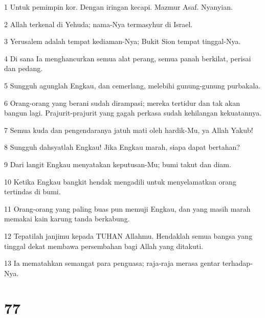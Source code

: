 \par 1 Untuk pemimpin kor. Dengan iringan kecapi. Mazmur Asaf. Nyanyian.
\par 2 Allah terkenal di Yehuda; nama-Nya termasyhur di Israel.
\par 3 Yerusalem adalah tempat kediaman-Nya; Bukit Sion tempat tinggal-Nya.
\par 4 Di sana Ia menghancurkan semua alat perang, semua panah berkilat, perisai dan pedang.
\par 5 Sungguh agunglah Engkau, dan cemerlang, melebihi gunung-gunung purbakala.
\par 6 Orang-orang yang berani sudah dirampasi; mereka tertidur dan tak akan bangun lagi. Prajurit-prajurit yang gagah perkasa sudah kehilangan kekuatannya.
\par 7 Semua kuda dan pengendaranya jatuh mati oleh hardik-Mu, ya Allah Yakub!
\par 8 Sungguh dahsyatlah Engkau! Jika Engkau marah, siapa dapat bertahan?
\par 9 Dari langit Engkau menyatakan keputusan-Mu; bumi takut dan diam.
\par 10 Ketika Engkau bangkit hendak mengadili untuk menyelamatkan orang tertindas di bumi.
\par 11 Orang-orang yang paling buas pun memuji Engkau, dan yang masih marah memakai kain karung tanda berkabung.
\par 12 Tepatilah janjimu kepada TUHAN Allahmu. Hendaklah semua bangsa yang tinggal dekat membawa persembahan bagi Allah yang ditakuti.
\par 13 Ia mematahkan semangat para penguasa; raja-raja merasa gentar terhadap-Nya.

\chapter{77}

